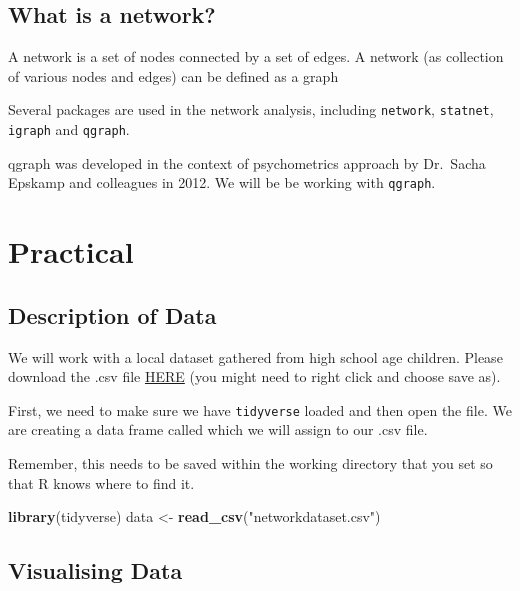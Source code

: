 \documentclass[]{book}
\newenvironment{Shaded}{\begin{snugshade}}{\end{snugshade}}
\newcommand{\KeywordTok}[1]{\textcolor[rgb]{0.13,0.29,0.53}{\textbf{#1}}}
\newcommand{\NormalTok}[1]{#1}
\newcommand{\StringTok}[1]{\textcolor[rgb]{0.31,0.60,0.02}{#1}}
\begin{document}
\hypertarget{what-is-a-network}{%
\section{What is a network?}\label{what-is-a-network}}

A network is a set of nodes connected by a set of edges. A network (as collection of various nodes and edges) can be defined as a graph

Several packages are used in the network analysis, including \texttt{network}, \texttt{statnet}, \texttt{igraph} and \texttt{qgraph}.

qgraph was developed in the context of psychometrics approach by Dr.~Sacha Epskamp and colleagues in 2012. We will be be working with \texttt{qgraph}.

\hypertarget{practical}{%
\chapter{Practical}\label{practical}}

\hypertarget{description-of-data}{%
\section{Description of Data}\label{description-of-data}}

We will work with a local dataset gathered from high school age children. Please download the .csv file \href{data/networkdataset.csv}{HERE} (you might need to right click and choose save as).

First, we need to make sure we have \texttt{tidyverse} loaded and then open the file. We are creating a data frame called which we will assign to our .csv file.

Remember, this needs to be saved within the working directory that you set so that R knows where to find it.

\begin{Shaded}
\begin{Highlighting}[]
\KeywordTok{library}\NormalTok{(tidyverse)}
\NormalTok{data <-}\StringTok{ }\KeywordTok{read_csv}\NormalTok{(}\StringTok{"networkdataset.csv"}\NormalTok{)}
\end{Highlighting}
\end{Shaded}

\hypertarget{visualising-data}{%
\section{Visualising Data}\label{visualising-data}}
\end{document}
